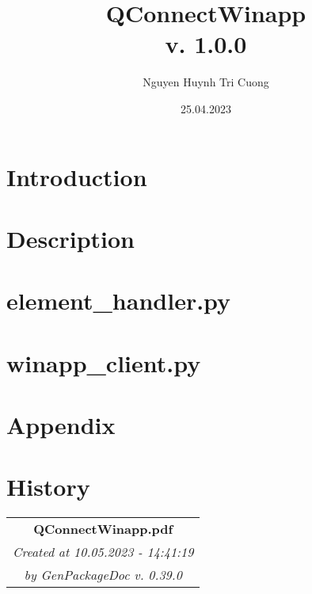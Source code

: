 \documentclass[a4paper,10pt]{report}
\title{\textbf{QConnectWinapp}\\
\vspace{2ex}
\textbf{v. 1.0.0}}
\author{Nguyen Huynh Tri Cuong}
\date{25.04.2023}
\begin{document}
\hypersetup{pageanchor=false}

\maketitle

\clearpage
{}
\tableofcontents

\clearpage
{}

\hypersetup{pageanchor=true}

      

\chapter{Introduction}\label{introduction}

      

\chapter{Description}\label{description}

      

\chapter{element\_handler.py}\label{qconnectwinapp-actionhandlers-element-handler}

      

\chapter{winapp\_client.py}\label{qconnectwinapp-winappdriver-winapp-client}

      

\chapter{Appendix}\label{appendix}

      

\chapter{History}\label{history}

      
\vfill
\begin{center}
\begin{tabular}{m{16em}}\hline
   \multicolumn{1}{c}{\textbf{QConnectWinapp.pdf}}\\
   \multicolumn{1}{c}{\textit{Created at 10.05.2023 - 14:41:19}}\\
   \multicolumn{1}{c}{\textit{by GenPackageDoc v. 0.39.0}}\\ \hline
\end{tabular}
\end{center}
\end{document}
